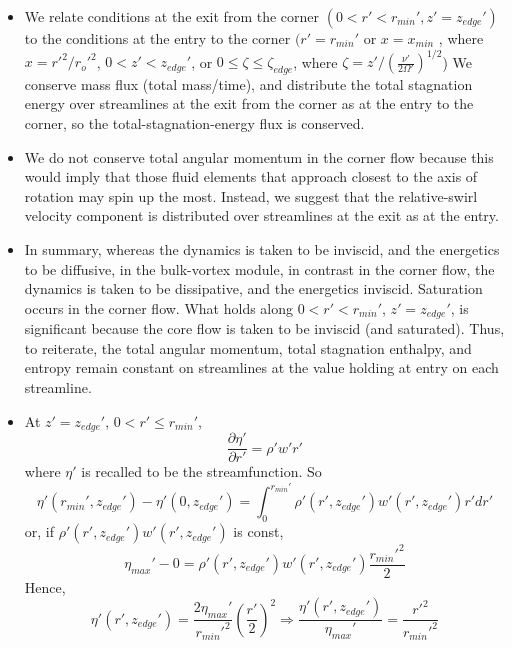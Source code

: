 \documentclass[preprint, prX]{revtex4}
\newcommand{\pfrac}[2]{\left(\frac{#1}{#2}\right)}
\newcommand{\pd}[2]{\frac{\partial#1}{\partial#2}}
\newcommand{\rmin}{r_{min}}
\newcommand{\xmin}{x_{min}}
\newcommand{\zedge}{z_{edge}}
\begin{document}
\begin{itemize}
\item
We relate conditions at the exit from the corner $(0<r'<\rmin', z'=\zedge')$ to the conditions at the entry to the corner $(r'=\rmin'$ or $x=\xmin$ , where $x=r'^2/r_o'^2$,  $0 < z' < \zedge'$, or $0\leq \zeta \leq \zeta_{edge}$, where $\zeta = z'/ \pfrac{\nu'}{2\Omega'}^{1/2}$) We conserve mass flux (total mass/time), and distribute the total stagnation energy over streamlines at the exit from the corner as at the entry to the corner, so the total-stagnation-energy flux is conserved.

\item
We do not conserve total angular momentum in the corner flow because this would imply that those fluid elements that approach closest to the axis of rotation may spin up the most. Instead, we suggest that the relative-swirl velocity component is distributed over streamlines at the exit as at the entry.

\item
In summary, whereas the dynamics is taken to be inviscid, and the energetics to be diffusive, in the bulk-vortex module, in contrast in the corner flow, the dynamics is taken to be dissipative, and the energetics inviscid. Saturation occurs in the corner flow. What holds along $0 < r'<\rmin'$, $z'=\zedge'$, is significant because the core flow is taken to be inviscid (and saturated). Thus, to reiterate, the total angular momentum, total stagnation enthalpy, and entropy remain constant on streamlines at the value holding at entry on each streamline.

\item
At $z'=\zedge'$, $0<r'\leq \rmin'$,
\begin{equation}
\pd{\eta'}{r'} = \rho' w' r'
\end{equation}
where $\eta'$ is recalled to be the streamfunction. So
\begin{equation}
\eta'(\rmin',\zedge') - \eta'(0,\zedge') = \int_0^{\rmin'} \rho'(r',\zedge') w'(r',\zedge') r'dr'
\end{equation}
or, if $\rho'(r',\zedge')w'(r',\zedge')$ is const,
\begin{equation}
\eta_{max}' - 0 = \rho'(r',\zedge') w'(r',\zedge')\frac{\rmin'^2}{2}
\label{eq:corestreamconst}
\end{equation}
Hence,
\begin{equation}
\eta'(r',\zedge') = \frac{2 \eta_{max}'}{\rmin'^2}\pfrac{r'}{2}^2 \Rightarrow \frac{\eta'(r',\zedge')}{\eta_{max}'} = \frac{r'^2}{\rmin'^2}
\end{equation}


\end{itemize}
\end{document}
